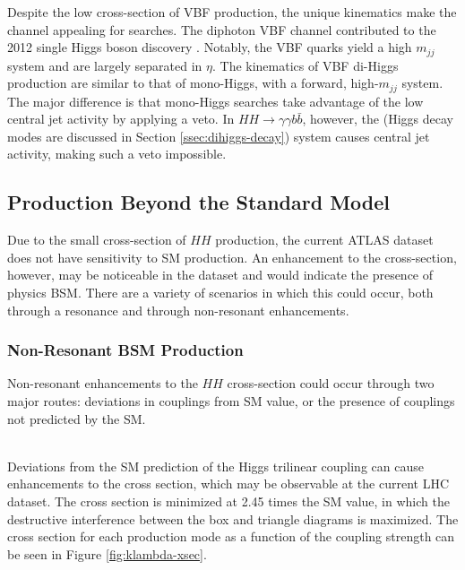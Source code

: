 Despite the low cross-section of \gls{VBF} production, the unique kinematics make the channel appealing for searches. The diphoton \gls{VBF} channel contributed to the 2012 single Higgs boson discovery \cite{higgs-discovery-atlas}. Notably, the \gls{VBF} quarks yield a high $m_{jj}$ system and are largely separated in $\eta$. The kinematics of \gls{VBF} di-Higgs production are similar to that of mono-Higgs, with a forward, high-$m_{jj}$ system. The major difference is that mono-Higgs searches take advantage of the low central jet activity by applying a veto. In $HH \rightarrow \gamma \gamma b\bar{b}$, however, the \Hbb (Higgs decay modes are discussed in Section \ref{ssec:dihiggs-decay}) system causes central jet activity, making such a veto impossible.


\subsection{Production Beyond the Standard Model}

Due to the small cross-section of $HH$ production, the current ATLAS dataset does not have sensitivity to \gls{SM} production. An enhancement to the cross-section, however, may be noticeable in the dataset and would indicate the presence of physics \gls{BSM}. There are a variety of scenarios in which this could occur, both through a resonance and through non-resonant enhancements.

\subsubsection{Non-Resonant BSM Production}

Non-resonant enhancements to the $HH$ cross-section could occur through two major routes: deviations in couplings from \gls{SM} value, or the presence of couplings not predicted by the \gls{SM}.

\noindent{${\boldsymbol \kappa_{\lambda}}$}\\
\indent Deviations from the \gls{SM} prediction of the Higgs trilinear coupling can cause enhancements to the cross section, which may be observable at the current \gls{LHC} dataset. The cross section is minimized at 2.45 times the \gls{SM} value, in which the destructive interference between the box and triangle diagrams is maximized. The cross section for each production mode as a function of the coupling strength can be seen in Figure \ref{fig:klambda-xsec}.

